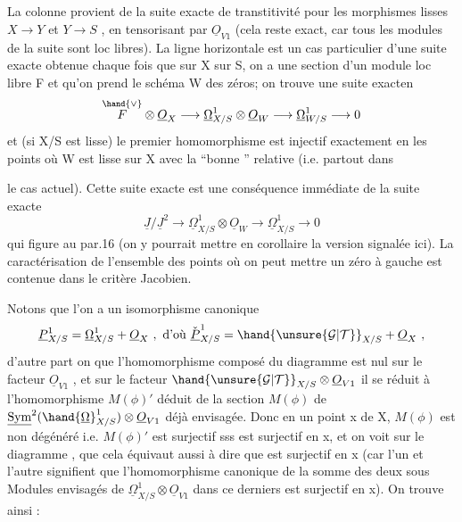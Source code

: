 
La colonne provient de la suite exacte de transtitivité pour les
morphismes lisses $X\to Y$ et $Y\to S$ , en  tensorisant par $\underline{O}_{V1}$ (cela reste
exact, car tous les modules de la suite sont loc libres). La ligne
horizontale est un cas particulier d'une suite exacte obtenue chaque
fois que sur X  sur S, on a une section \unsure{$\phi$} d'un module loc libre F
et qu'on prend le schéma W des zéros; on trouve une suite exacten
\[ \overset{\hand{\vee}}{F}\otimes \underline{O}_X \longrightarrow \underline{\Omega}^1_{X/S}\otimes \underline{O}_W \longrightarrow \underline{\Omega}^1_{W/S} \longrightarrow 0 \]
et (si X/S est lisse) le premier homomorphisme est injectif exactement en les points où
W est lisse sur X avec la ``bonne ''  relative (i.e. partout dans

le cas actuel).  Cette suite exacte est 
  une
conséquence immédiate de la suite exacte
\[ \underline{J}/\underline{J}^2\longrightarrow \underline{\Omega}^1_{X/S}\otimes \underline{O}_W \longrightarrow \underline{\Omega}^1_{X/S} \longrightarrow 0 \]
\placedmargin{16 \textbar} qui figure au par.16 (on y pourrait mettre en corollaire la version
signalée ici). La caractérisation de l'ensemble des points où on
peut mettre un zéro à gauche est contenue dans le critère Jacobien.

Notons que l'on a un isomorphisme canonique
\[ \underline{P}^1_{X/S} = \underline{\Omega}^1_{X/S} + \underline{O}_X \ ,\ \text{d'où}\ \check{\underline{P}}^1_{X/S} = \hand{\unsure{\mathcal{G}|\mathcal{T}}}_{X/S} + \underline{O}_X \ , \]
d'autre part on  que l'homomorphisme composé \hand{$\mu$} du diagramme  est nul
sur le facteur $\underline{O}_{V1}$ , et sur le facteur $\hand{\unsure{\mathcal{G}|\mathcal{T}}}_{X/S}\otimes\underline{O}_{V1}$ il se réduit à
l'homomorphisme $M(\phi)'$ déduit de la section $M(\phi)$ de $\underline{\mathrm{Sym}}^2(\hand{\underline{\Omega}}^1_{X/S})\otimes \underline{O}_{V1}$ déjà
envisagée. Donc en un point x de X, $M(\phi)$ est non dégénéré i.e. $M(\phi)'$
est surjectif sss \hand{$\mu$} est surjectif en x, et on voit sur le diagramme ,
que cela équivaut aussi à dire que \unsure{\hand{$\nu$}} est surjectif en x (car l'un et l'autre
signifient que l'homomorphisme canonique de la somme des deux sous
Modules envisagés de $\underline{\Omega}^1_{X/S}\otimes \underline{O}_{V1}$ dans ce derniers est surjectif en
x). On trouve ainsi :

